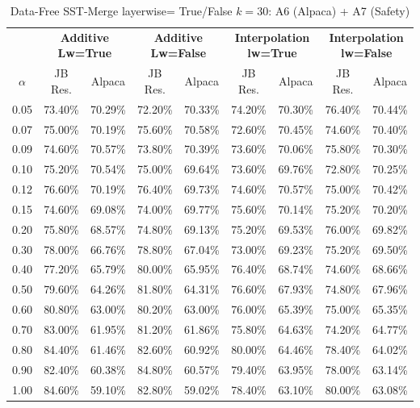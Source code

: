 \begin{table}[h]
\centering
\caption{Data-Free SST-Merge layerwise= True/False $k=30$: A6 (Alpaca) + A7 (Safety)}
\label{tab:res_a6_a7_data_free_sst_30}
\begin{tabular}{c|cc|cc|cc|cc}
\hline
 & \multicolumn{2}{c|}{\textbf{Additive Lw=True}} & \multicolumn{2}{c|}{\textbf{Additive Lw=False}} & \multicolumn{2}{c|}{\textbf{Interpolation lw=True}}& \multicolumn{2}{c}{\textbf{Interpolation lw=False}} \\
$\alpha$ & JB Res. & Alpaca & JB Res. & Alpaca & JB Res. & Alpaca & JB Res. & Alpaca \\
\hline
0.05 & 73.40\% & 70.29\% & 72.20\% & 70.33\% & 74.20\% & 70.30\% & 76.40\% & 70.44\% \\
0.07 & 75.00\% & 70.19\% & 75.60\% & 70.58\% & 72.60\% & 70.45\% & 74.60\% & 70.40\% \\
0.09 & 74.60\% & 70.57\% & 73.80\% & 70.39\% & 73.60\% & 70.06\% & 75.80\% & 70.30\% \\
0.10 & 75.20\% & 70.54\% & 75.00\% & 69.64\% & 73.60\% & 69.76\% & 72.80\% & 70.25\% \\
0.12 & 76.60\% & 70.19\% & 76.40\% & 69.73\% & 74.60\% & 70.57\% & 75.00\% & 70.42\% \\
0.15 & 74.60\% & 69.08\% & 74.00\% & 69.77\% & 75.60\% & 70.14\% & 75.20\% & 70.20\% \\
0.20 & 75.80\% & 68.57\% & 74.80\% & 69.13\% & 75.20\% & 69.53\% & 76.00\% & 69.82\% \\
0.30 & 78.00\% & 66.76\% & 78.80\% & 67.04\% & 73.00\% & 69.23\% & 75.20\% & 69.50\% \\
0.40 & 77.20\% & 65.79\% & 80.00\% & 65.95\% & 76.40\% & 68.74\% & 74.60\% & 68.66\% \\
0.50 & 79.60\% & 64.26\% & 81.80\% & 64.31\% & 76.60\% & 67.93\% & 74.80\% & 67.96\% \\
0.60 & 80.80\% & 63.00\% & 80.20\% & 63.00\% & 76.00\% & 65.39\% & 75.00\% & 65.35\% \\
0.70 & 83.00\% & 61.95\% & 81.20\% & 61.86\% & 75.80\% & 64.63\% & 74.20\% & 64.77\% \\
0.80 & 84.40\% & 61.46\% & 82.60\% & 60.92\% & 80.00\% & 64.46\% & 78.40\% & 64.02\% \\
0.90 & 82.40\% & 60.38\% & 84.80\% & 60.57\% & 79.40\% & 63.95\% & 78.00\% & 63.14\% \\
1.00 & 84.60\% & 59.10\% & 82.80\% & 59.02\% & 78.40\% & 63.10\% & 80.00\% & 63.08\% \\
\hline
\end{tabular}
\end{table}
\FloatBarrier

